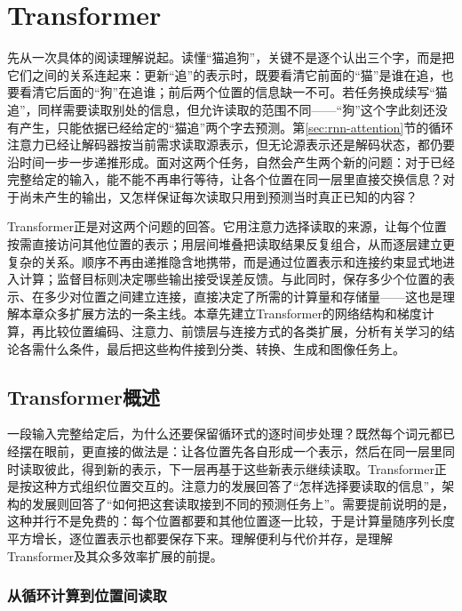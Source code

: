 \chapter{Transformer}
\label{chap:transformer}

先从一次具体的阅读理解说起。读懂“猫追狗”，关键不是逐个认出三个字，而是把它们之间的关系连起来：更新“追”的表示时，既要看清它前面的“猫”是谁在追，也要看清它后面的“狗”在追谁；前后两个位置的信息缺一不可。若任务换成续写“猫追”，同样需要读取别处的信息，但允许读取的范围不同——“狗”这个字此刻还没有产生，只能依据已经给定的“猫追”两个字去预测。第\ref{sec:rnn-attention}节的循环注意力已经让解码器按当前需求读取源表示，但无论源表示还是解码状态，都仍要沿时间一步一步递推形成。面对这两个任务，自然会产生两个新的问题：对于已经完整给定的输入，能不能不再串行等待，让各个位置在同一层里直接交换信息？对于尚未产生的输出，又怎样保证每次读取只用到预测当时真正已知的内容？

Transformer正是对这两个问题的回答。它用注意力选择读取的来源，让每个位置按需直接访问其他位置的表示；用层间堆叠把读取结果反复组合，从而逐层建立更复杂的关系。顺序不再由递推隐含地携带，而是通过位置表示和连接约束显式地进入计算；监督目标则决定哪些输出接受误差反馈。与此同时，保存多少个位置的表示、在多少对位置之间建立连接，直接决定了所需的计算量和存储量——这也是理解本章众多扩展方法的一条主线。本章先建立Transformer的网络结构和梯度计算，再比较位置编码、注意力、前馈层与连接方式的各类扩展，分析有关学习的结论各需什么条件，最后把这些构件接到分类、转换、生成和图像任务上。

\FloatBarrier
\section{Transformer概述}
\label{sec:transformer-overview}

一段输入完整给定后，为什么还要保留循环式的逐时间步处理？既然每个词元都已经摆在眼前，更直接的做法是：让各位置先各自形成一个表示，然后在同一层里同时读取彼此，得到新的表示，下一层再基于这些新表示继续读取。Transformer正是按这种方式组织位置交互的。注意力的发展回答了“怎样选择要读取的信息”，架构的发展则回答了“如何把这套读取接到不同的预测任务上”。需要提前说明的是，这种并行不是免费的：每个位置都要和其他位置逐一比较，于是计算量随序列长度平方增长，逐位置表示也都要保存下来。理解便利与代价并存，是理解Transformer及其众多效率扩展的前提。

\subsection{从循环计算到位置间读取}
\label{sec:transformer-core-idea}

